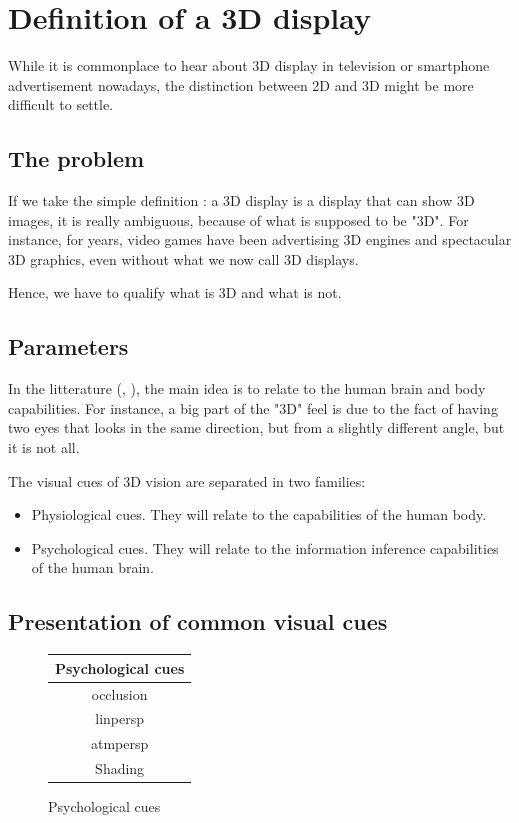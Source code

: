 \section{Definition of a 3D display}
While it is commonplace to hear about 3D display in television or smartphone advertisement nowadays, the distinction between 2D and 3D might be more difficult to settle.
\subsection{The problem}
If we take the simple definition : a 3D display is a display that can show 3D images, it is really ambiguous, because of what is supposed to be "3D". For instance, for years, video games have been advertising 3D engines and spectacular 3D graphics, even without what we now call 3D displays.

Hence, we have to qualify what is 3D and what is not.
\subsection{Parameters}
In the litterature (\cite{okoshi1976three}, \cite{pimenta2012comprehensive}), the main idea is to relate to the human brain and body capabilities. For instance, a big part of the "3D" feel is due to the fact of having two eyes that looks in the same direction, but from a slightly different angle, but it is not all.

The visual cues of 3D vision are separated in two families:  
\begin{itemize}
\item Physiological cues. They will relate to the capabilities of the human body.
\item Psychological cues. They will relate to the information inference capabilities of the human brain.
\end{itemize}
\subsection{Presentation of common visual cues}

\begin{figure}[h!]
\centering
\begin{tabular}{|c|}
\hline
Psychological cues \\
\hline
\Gls{occlusion} \\
\Gls{linpersp} \\
\Gls{atmpersp} \\
Shading \\
\hline
\end{tabular}
\caption{Psychological cues}
\end{figure}
